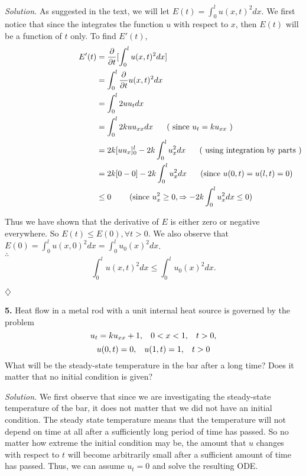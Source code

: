 \documentclass{article}
\begin{document}
\vspace{3mm}
\noindent
\textit{Solution.} As suggested in the text, we will let \(E(t)=\int_0^l u(x,t)^2 dx \). We first notice that since the integrates the function \(u\) with respect to \(x\), then \(E(t)\) will be a function of \(t\) only. 
To find \(E'(t)\), 
\begin{align*}
E'(t) &= \frac{\partial}{\partial t}[\int_0^l u(x,t)^2 dx ] \\
 &=\int_0^l   \frac{\partial}{\partial t}u(x,t)^2 dx  \\
\hspace{40mm}  &= \int_0^l 2 u u_t dx  \\
 &= \int_0^l 2k u u_{xx} dx    \hspace{6mm} (\text{ since \(u_t = ku_{xx}\) }) \\
&= 2k[u u_x]_0^l  - 2k \int_0^l u_x^2 dx  \hspace{6mm} (\text{ using integration by parts }) \\
 &= 2k[0-0] -2k\int_0^l u_x^2 dx   \hspace{6mm} (\text{since }u(0,t) = u(l,t) = 0 ) \\
 & \leq 0 \hspace{8mm}    (\text{since  } u_x^2 \geq 0, \Rightarrow -2k\int_0^l u_x^2 dx \leq 0)
\end{align*}

\noindent 
Thus we have shown that the derivative of \(E\) is either zero or negative everywhere. So \(E(t) \leq E(0) , \forall t >0 \).  We also observe that \(E(0) = \int_0^l u(x,0)^2 dx =\int_0^l u_0(x)^2 dx \). \\
\(\therefore \) \[ \int_0^l u(x,t)^2 dx \leq \int_0^l u_0(x)^2 dx. \]

\begin{flushright}
\( \diamondsuit \) 
\end{flushright}



\newpage
\noindent
\textbf{5.} Heat flow in a metal rod with a unit internal heat source is governed by the problem
\[ u_t = ku_{xx} +1,   \hspace{3mm}  0<x<1,  \hspace{3mm}  t>0,\]
\[ u(0,t) = 0,  \hspace{3mm} u(1,t) = 1,  \hspace{3mm}  t>0 \]
\noindent
What will be the steady-state temperature in the bar after a long time? Does it matter that no initial condition is given?

\vspace{3mm}
\noindent
\textit{Solution.} We first observe that since we are investigating the steady-state temperature of the bar, it does not matter that we did not have an initial condition. The steady state temperature means that the temperature will not depend on time at all after a sufficiently long period of time has passed. So no matter how extreme the initial condition may be, the amount that \(u\) changes with respect to \(t\) will become arbitrarily small after a sufficient amount of time has passed. 
 \newline
 \noindent
Thus, we can assume \(u_t = 0\) and solve the resulting ODE. 
\end{document}
